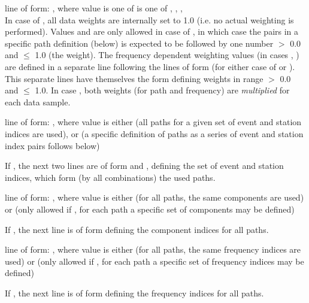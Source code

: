 line of form: , where value is one of is one of , , 
, \\
In case of , all data weights are internally set to 1.0 (i.e. no actual weighting is performed).
Values  and  are only allowed in case of , in which case
the pairs  in a specific path definition (below) is expected to be followed by one number $>$ 0.0 and $\le$ 1.0 (the weight).
The frequency dependent weighting values (in cases , ) are defined
in a separate line following the lines of form  (for either case of 
or ). This separate lines have themselves the form  defining  weights
in range $>$ 0.0 and $\le$ 1.0. 
In case , both weights (for path and frequency) are \emph{multiplied} for each data sample.

line of form: , where value is either  (all paths for a given set of event and station indices
are used), or  (a specific definition of paths as a series of event and station index pairs follows below)

If , the next two lines are of form  and , defining the set
of event and station indices, which form (by all combinations) the used paths. 

line of form: , where value is either  (for all paths, the same components are used) or 
(only allowed if , for each path a specific set of components may be defined)

If , the next line is of form  defining the component indices for all paths.

line of form: , where value is either  (for all paths, the same frequency indices are used) or 
(only allowed if , for each path a specific set of frequency indices may be defined)

If , the next line is of form  defining the frequency indices for all paths.

